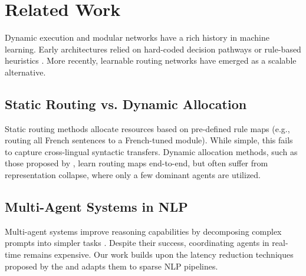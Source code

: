 \section{Related Work}
\label{sec:related}
Dynamic execution and modular networks have a rich history in machine learning. Early architectures relied on hard-coded decision pathways or rule-based heuristics \citep{chen2022frameworks}. More recently, learnable routing networks have emerged as a scalable alternative.

\subsection{Static Routing vs. Dynamic Allocation}
Static routing methods \citep{dupont2021attention} allocate resources based on pre-defined rule maps (e.g., routing all French sentences to a French-tuned module). While simple, this fails to capture cross-lingual syntactic transfers. Dynamic allocation methods, such as those proposed by \citet{roberts2023transformers}, learn routing maps end-to-end, but often suffer from representation collapse, where only a few dominant agents are utilized.

\subsection{Multi-Agent Systems in NLP}
Multi-agent systems improve reasoning capabilities by decomposing complex prompts into simpler tasks \citep{kim2022modular}. Despite their success, coordinating agents in real-time remains expensive. Our work builds upon the latency reduction techniques proposed by the \citet{nimbus2024latency} and adapts them to sparse NLP pipelines.
